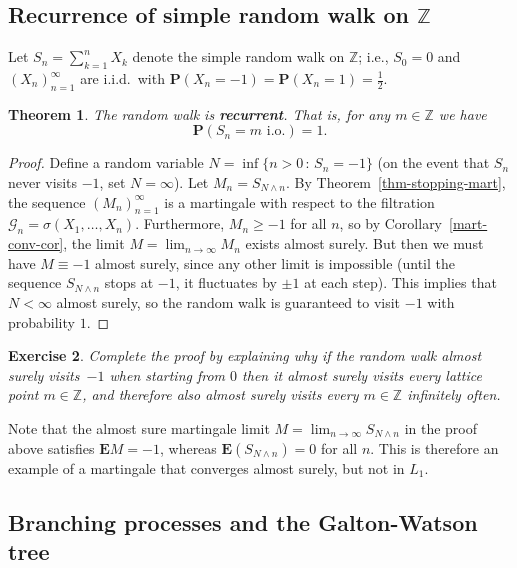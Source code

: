 \documentclass[12pt]{article}
\newtheorem{thm}{Theorem}[section]
\newtheorem{exercise}[thm]{Exercise}
\newcommand{\Z}{\mathbb{Z}}
\newcommand{\prob}{\mathbf{P}}
\newcommand{\expec}{\mathbf{E}}
\theoremstyle{example}
\begin{document}
\subsection{Recurrence of simple random walk on $\mathbb{Z}$}

Let $S_n = \sum_{k=1}^n X_k$ denote the simple random walk on $\Z$; i.e., $S_0=0$ and $(X_n)_{n=1}^\infty$ are i.i.d.\ with $\prob(X_n=-1)=\prob(X_n=1)=\tfrac12$.

\begin{thm} The random walk is \textbf{recurrent}. That is, for any $m\in\Z$ we have
$$ \prob(S_n = m \textrm{ i.o.}) = 1. $$
\end{thm}

\begin{proof} Define a random variable $N = \inf \{ n>0\,:\, S_n = -1 \}$ (on the event that $S_n$ never visits $-1$, set $N=\infty$). Let $M_n = S_{N\wedge n}$. By Theorem~\ref{thm-stopping-mart}, the sequence $(M_n)_{n=1}^\infty$ is a martingale with respect to the filtration $\mathcal{G}_n = \sigma(X_1,\ldots,X_n)$. Furthermore, $M_n \ge -1$ for all $n$, so by Corollary~\ref{mart-conv-cor}, the limit $M=\lim_{n\to\infty} M_n$ exists almost surely. But then we must have $M\equiv -1$ almost surely, since any other limit is impossible (until the sequence $S_{N\wedge n}$ stops at $-1$, it fluctuates by $\pm 1$ at each step). This implies that $N<\infty$ almost surely, so the random walk is guaranteed to visit $-1$ with probability $1$.
\end{proof}

\begin{exercise} Complete the proof by explaining why if the random walk almost surely visits~$-1$ when starting from $0$ then it almost surely visits every lattice point $m\in\Z$, and therefore also almost surely visits every $m\in\Z$ infinitely often. %
\end{exercise}

Note that the almost sure martingale limit $M=\lim_{n\to\infty} S_{N\wedge n}$ in the proof above satisfies $\expec M=-1$, whereas $\expec(S_{N \wedge n})=0$ for all $n$. This is therefore an example of a martingale that converges almost surely, but not in $L_1$.

%
%

\subsection{Branching processes and the Galton-Watson tree}
\end{document}
